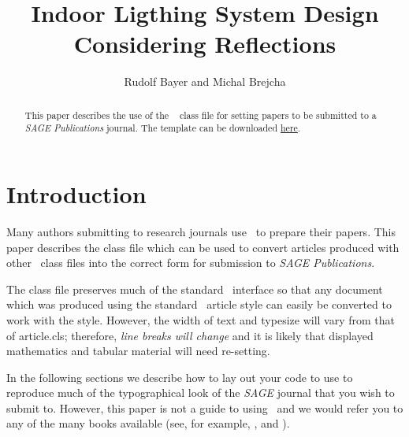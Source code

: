 \documentclass[Afour,sageh,times,doublespace]{sagej}
\begin{document}

\title{Indoor Ligthing System Design Considering Reflections}

\author{Rudolf Bayer and Michal Brejcha}




\begin{abstract}
This paper describes the use of the \LaTeXe\
\textsf{\journalclass} class file for setting papers to be
submitted to a \textit{SAGE Publications} journal.
The template can be downloaded \href{http://www.uk.sagepub.com/repository/binaries/SAGE LaTeX template.zip}{here}.
\end{abstract}


\maketitle

\section{Introduction}
Many authors submitting to research journals use \LaTeXe\ to
prepare their papers. This paper describes the
\textsf{\journalclass} class file which can be used to convert
articles produced with other \LaTeXe\ class files into the correct
form for submission to \textit{SAGE Publications}.

The \textsf{\journalclass} class file preserves much of the
standard \LaTeXe\ interface so that any document which was
produced using the standard \LaTeXe\ \textsf{article} style can
easily be converted to work with the \textsf{\journalclassshort}
style. However, the width of text and typesize will vary from that
of \textsf{article.cls}; therefore, \textit{line breaks will change}
and it is likely that displayed mathematics and tabular material
will need re-setting.

In the following sections we describe how to lay out your code to
use \textsf{\journalclass} to reproduce much of the typographical look of
the \textit{SAGE} journal that you wish to submit to. However, this paper is not a guide to
using \LaTeXe\ and we would refer you to any of the many books
available (see, for example, \cite{R1}, \cite{R2} and \cite{R3}).
\end{document}
